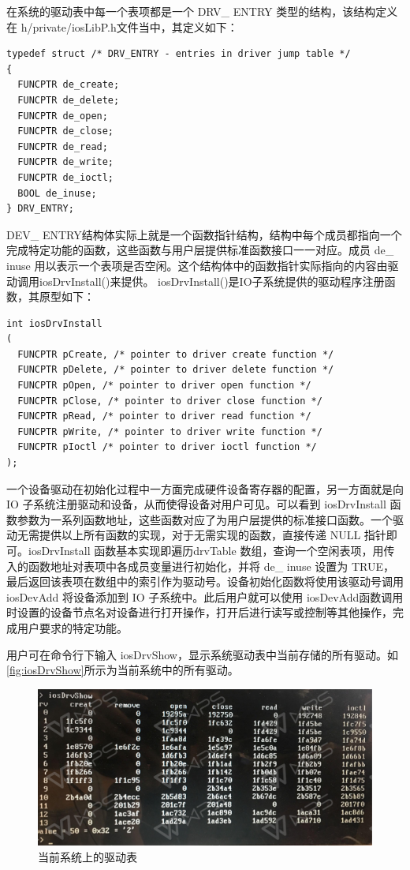 在系统的驱动表中每一个表项都是一个 DRV\_ ENTRY 类型的结构，该结构定义在 h/private/iosLibP.h文件当中，其定义如下：
\lstset{language=C}
\begin{lstlisting}
typedef struct /* DRV_ENTRY - entries in driver jump table */ 
{ 
  FUNCPTR de_create; 
  FUNCPTR de_delete; 
  FUNCPTR de_open; 
  FUNCPTR de_close; 
  FUNCPTR de_read; 
  FUNCPTR de_write; 
  FUNCPTR de_ioctl; 
  BOOL de_inuse; 
} DRV_ENTRY; 
\end{lstlisting}
DEV\_ ENTRY结构体实际上就是一个函数指针结构，结构中每个成员都指向一个完成特定功能的函数，这些函数与用户层提供标准函数接口一一对应。成员 de\_ inuse 用以表示一个表项是否空闲。这个结构体中的函数指针实际指向的内容由驱动调用iosDrvInstall()来提供。 iosDrvInstall()是IO子系统提供的驱动程序注册函数，其原型如下：
\lstset{language=C}
\begin{lstlisting}
int iosDrvInstall 
( 
  FUNCPTR pCreate, /* pointer to driver create function */ 
  FUNCPTR pDelete, /* pointer to driver delete function */ 
  FUNCPTR pOpen, /* pointer to driver open function */ 
  FUNCPTR pClose, /* pointer to driver close function */ 
  FUNCPTR pRead, /* pointer to driver read function */ 
  FUNCPTR pWrite, /* pointer to driver write function */ 
  FUNCPTR pIoctl /* pointer to driver ioctl function */ 
); 
\end{lstlisting}
一个设备驱动在初始化过程中一方面完成硬件设备寄存器的配置，另一方面就是向 IO 子系统注册驱动和设备，从而使得设备对用户可见。可以看到 iosDrvInstall 函数参数为一系列函数地址，这些函数对应了为用户层提供的标准接口函数。一个驱动无需提供以上所有函数的实现，对于无需实现的函数，直接传递 NULL 指针即可。iosDrvInstall 函数基本实现即遍历drvTable 数组，查询一个空闲表项，用传入的函数地址对表项中各成员变量进行初始化，并将 de\_ inuse 设置为 TRUE，最后返回该表项在数组中的索引作为驱动号。设备初始化函数将使用该驱动号调用 iosDevAdd 将设备添加到 IO 子系统中。此后用户就可以使用 iosDevAdd函数调用时设置的设备节点名对设备进行打开操作，打开后进行读写或控制等其他操作，完成用户要求的特定功能。

	用户可在命令行下输入 iosDrvShow，显示系统驱动表中当前存储的所有驱动。如\autoref{fig:iosDrvShow}所示为当前系统中的所有驱动。
\begin{figure}[!h]
\centering
\includegraphics[width=.9\textwidth]{./graphics/iosDrvShow.pdf}
\caption{当前系统上的驱动表}\label{fig:iosDrvShow}
\end{figure}

